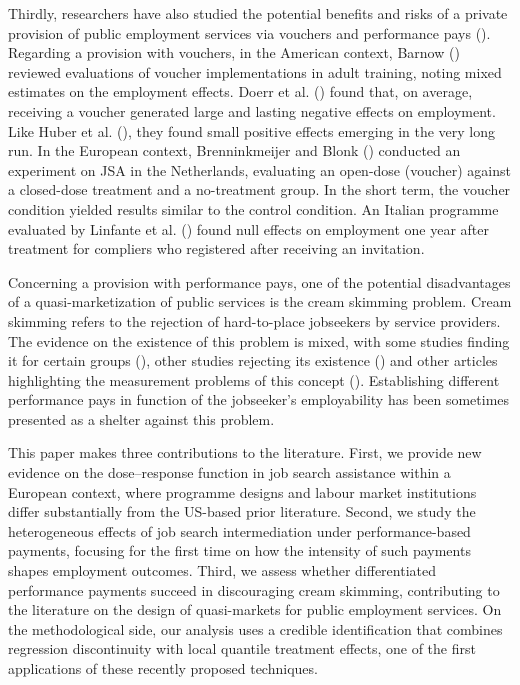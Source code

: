 \documentclass[
  11pt]{article}
\begin{document}
Thirdly, researchers have also studied the potential benefits and risks
of a private provision of public employment services via vouchers and
performance pays ().
Regarding a provision with vouchers, in the American context, Barnow
() reviewed evaluations of voucher
implementations in adult training, noting mixed estimates on the
employment effects. Doerr et al. ()
found that, on average, receiving a voucher generated large and lasting
negative effects on employment. Like Huber et al.
(), they found small positive effects
emerging in the very long run. In the European context, Brenninkmeijer
and Blonk () conducted an
experiment on JSA in the Netherlands, evaluating an open-dose (voucher)
against a closed-dose treatment and a no-treatment group. In the short
term, the voucher condition yielded results similar to the control
condition. An Italian programme evaluated by Linfante et al.
() found null effects on employment
one year after treatment for compliers who registered after receiving an
invitation.

Concerning a provision with performance pays, one of the potential
disadvantages of a quasi-marketization of public services is the cream
skimming problem. Cream skimming refers to the rejection of
hard-to-place jobseekers by service providers. The evidence on the
existence of this problem is mixed, with some studies finding it for
certain groups (), other studies rejecting its existence
() and other articles
highlighting the measurement problems of this concept
(). Establishing
different performance pays in function of the jobseeker's employability
has been sometimes presented as a shelter against this problem.

This paper makes three contributions to the literature. First, we
provide new evidence on the dose--response function in job search
assistance within a European context, where programme designs and labour
market institutions differ substantially from the US-based prior
literature. Second, we study the heterogeneous effects of job search
intermediation under performance-based payments, focusing for the first
time on how the intensity of such payments shapes employment outcomes.
Third, we assess whether differentiated performance payments succeed in
discouraging cream skimming, contributing to the literature on the
design of quasi-markets for public employment services. On the
methodological side, our analysis uses a credible identification that
combines regression discontinuity with local quantile treatment effects,
one of the first applications of these recently proposed techniques.
\end{document}
